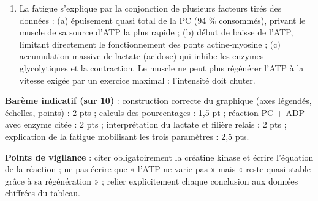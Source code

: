 \documentclass[11pt]{article}
\newcommand{\cle}[1]{{\popxbold\color{popdark}#1}}
\begin{document}
\begin{corrige}
\begin{enumerate}
\item La fatigue s'explique par la conjonction de plusieurs facteurs tirés des données : (a) épuisement quasi total de la PC (94 \% consommés), privant le muscle de sa source d'ATP la plus rapide ; (b) début de baisse de l'ATP, limitant directement le fonctionnement des ponts actine-myosine ; (c) accumulation massive de lactate (acidose) qui inhibe les enzymes glycolytiques et la contraction. Le muscle ne peut plus régénérer l'ATP à la vitesse exigée par un exercice maximal : l'intensité doit chuter.
\end{enumerate}
\textbf{Barème indicatif (sur 10)} : construction correcte du graphique (axes légendés, échelles, points) : 2 pts ; calculs des pourcentages : 1,5 pt ; réaction PC + ADP avec enzyme citée : 2 pts ; interprétation du lactate et filière relais : 2 pts ; explication de la fatigue mobilisant les trois paramètres : 2,5 pts.\par
\textbf{Points de vigilance} : citer obligatoirement la \cle{créatine kinase} et écrire l'équation de la réaction ; ne pas écrire que « l'ATP ne varie pas » mais « reste quasi stable grâce à sa régénération » ; relier explicitement chaque conclusion aux données chiffrées du tableau.
\end{corrige}
\end{document}
